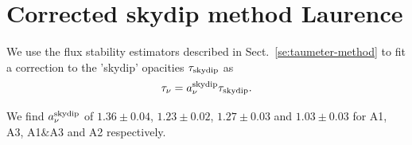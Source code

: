\section{Corrected skydip method {\color{blue} Laurence}}
\label{se:corrected-skydip}

We use the flux stability estimators described in
Sect.~\ref{se:taumeter-method} to fit a correction to the 'skydip'
opacities $\tau_{\rm{skydip}}$ as
\begin{equation}  
  \tau_\nu =  a_\nu^{\rm{skydip}}\tau_{\rm{skydip}}.        
\end{equation}

We find $a_\nu^{\rm{skydip}}$ of
$1.36 \pm 0.04$,
$1.23 \pm 0.02$,
$1.27 \pm 0.03$ and
$1.03 \pm 0.03$ for A1, A3, A1$\&$A3 and A2 respectively.



